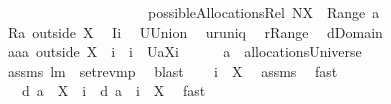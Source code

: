 \begin{isabellebody}
\ \ \ \ \ \ \ \ \ \ \ \ \ \ \ \ \ \ \ \ \ possibleAllocationsRel\ {\isacharparenleft}N{\isacharminus}X{\isacharparenright}\ {\isacharparenleft}{\isasymUnion}\ {\isacharparenleft}Range\ a{\isacharparenright}{\isacharparenright}{\isachardoublequoteclose}\isanewline
%
\isadelimproof
%
\endisadelimproof
%
\isatagproof
{}\isamarkupfalse%
\ {\isacharminus}\isanewline
\ \ \isamarkupfalse%
\ {\isacharquery}R{\isacharequal}{\isachardoublequoteopen}a\ outside\ X{\isachardoublequoteclose}\ \isamarkupfalse%
\ {\isacharquery}I{\isacharequal}{\isachardoublequoteopen}{\isacharbraceleft}i{\isacharbraceright}{\isachardoublequoteclose}\ \isamarkupfalse%
\ {\isacharquery}U{\isacharequal}Union\ \isamarkupfalse%
\ {\isacharquery}u{\isacharequal}runiq\ \isamarkupfalse%
\ {\isacharquery}r{\isacharequal}Range\ \isamarkupfalse%
\ {\isacharquery}d{\isacharequal}Domain\isanewline
\ \ \isamarkupfalse%
\ {\isacharquery}aa{\isacharequal}{\isachardoublequoteopen}a\ outside\ {\isacharparenleft}X\ {\isasymunion}\ {\isacharbraceleft}i{\isacharbraceright}{\isacharparenright}\ {\isasymunion}\ {\isacharparenleft}{\isacharbraceleft}i{\isacharbraceright}\ {\isasymtimes}\ {\isacharbraceleft}{\isacharquery}U{\isacharparenleft}a{\isacharbackquote}{\isacharbackquote}{\isacharparenleft}X{\isasymunion}{\isacharbraceleft}i{\isacharbraceright}{\isacharparenright}{\isacharparenright}{\isacharbraceright}{\isacharparenright}{\isachardoublequoteclose}\ \isamarkupfalse%
\ \isanewline
\ \ {}{\isacharcolon}\ {\isachardoublequoteopen}a\ {\isasymin}\ allocationsUniverse{\isachardoublequoteclose}\ \isamarkupfalse%
\ assms{\isacharparenleft}{}{\isacharparenright}\ lm{}{}\ \ set{\isacharunderscore}rev{\isacharunderscore}mp\ \isamarkupfalse%
\ blast\isanewline
\ \ \isamarkupfalse%
\ {\isachardoublequoteopen}i\ {\isasymnotin}\ X{\isachardoublequoteclose}\ \isamarkupfalse%
\ assms\ \isamarkupfalse%
\ fast\ \isamarkupfalse%
\ \isamarkupfalse%
\ \isanewline
\ \ {}{\isacharcolon}\ {\isachardoublequoteopen}{\isacharquery}d\ a\ {\isacharminus}\ X\ {\isasymunion}\ {\isacharbraceleft}i{\isacharbraceright}\ {\isacharequal}\ {\isacharquery}d\ a\ {\isasymunion}\ {\isacharbraceleft}i{\isacharbraceright}\ {\isacharminus}\ X{\isachardoublequoteclose}\ \isamarkupfalse%
\ fast\isanewline
\ \ \isamarkupfalse%

\end{isabellebody}
